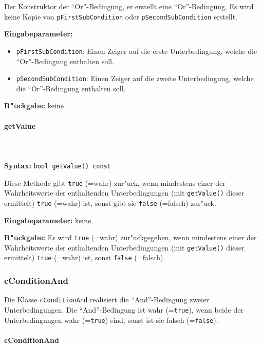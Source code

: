 \bigskip\noindent
Der Konstruktor der ``Or''-Bedingung, er erstellt eine ``Or''-Bedingung. Es wird keine Kopie von \verb|pFirstSubCondition| oder \verb|pSecondSubCondition| erstellt.

\bigskip\noindent
\textbf{Eingabeparameter:}
\begin{itemize}
 \item \verb|pFirstSubCondition|: Einen Zeiger auf die erste Unterbedingung, welche die ``Or''-Bedingung enthalten soll.
 \item \verb|pSecondSubCondition|: Einen Zeiger auf die zweite Unterbedingung, welche die ``Or''-Bedingung enthalten soll.
\end{itemize}

\bigskip\noindent
\textbf{R"uckgabe:} keine


\paragraph{getValue}

\ \\\\\noindent
\textbf{Syntax:} \verb|bool getValue() const|

\bigskip\noindent
Diese Methode gibt \verb|true| (=wahr) zur"uck, wenn mindestens einer der Wahrheitswerte der enthaltenden Unterbedingungen (mit \verb|getValue()| dieser ermittelt) \verb|true| (=wahr) ist, sonst gibt sie \verb|false| (=falsch) zur"uck.

\bigskip\noindent
\textbf{Eingabeparameter:} keine

\bigskip\noindent
\textbf{R"uckgabe:} Es wird \verb|true| (=wahr) zur"uckgegeben, wenn mindestens einer der Wahrheitswerte der enthaltenden Unterbedingungen (mit \verb|getValue()| dieser ermittelt) \verb|true| (=wahr) ist, sonst \verb|false| (=falsch).


\subsubsection{cConditionAnd}

Die Klasse \verb|cConditionAnd| realisiert die ``And''-Bedingung zweier Unterbedingungen. Die ``And''-Bedingung ist wahr (=\verb|true|), wenn beide der Unterbedingungen wahr (=\verb|true|) sind, sonst ist sie falsch  (=\verb|false|).

\paragraph{cConditionAnd}

